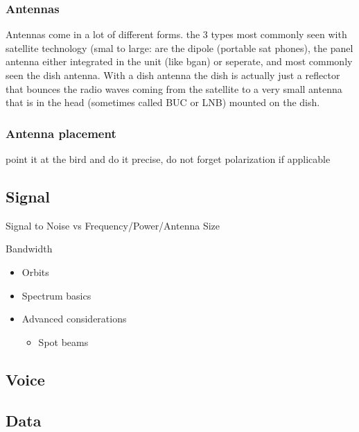 \subsubsection{Antennas}
\label{antennas}

Antennas come in a lot of different forms. the 3 types most commonly seen with satellite technology (smal to large: are the dipole (portable sat phones), the panel antenna either integrated in the unit (like bgan) or seperate, and most commonly seen the dish antenna. With a dish antenna the dish is actually just a reflector that bounces the radio waves coming from the satellite to a very small antenna that is in the head (sometimes called BUC or LNB) mounted on the dish. 

\subsubsection{Antenna placement}
\label{antennaplacement}

point it at the bird and do it precise, do not forget polarization if applicable

\subsection{Signal}
\label{signal}

Signal to Noise vs Frequency\slash Power\slash Antenna Size

Bandwidth

\begin{itemize}
\item Orbits

\item Spectrum basics

\item Advanced considerations

\begin{itemize}
\item Spot beams

\end{itemize}

\end{itemize}

\subsection{Voice}
\label{voice}

\subsection{Data}
\label{data}

